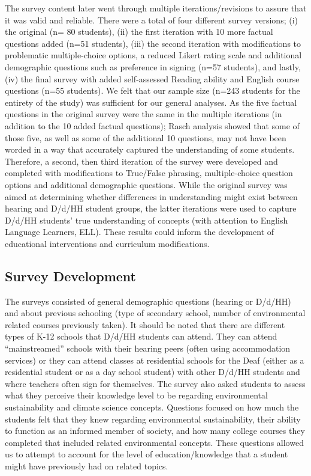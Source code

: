 \documentclass[11.5pt]{sig-alternate} %
\begin{document}
\begin{large}
The survey content later went through multiple iterations/revisions to assure that it was valid and reliable.  There were a total of four different survey versions; (i) the original (n= 80 students), (ii) the first iteration with 10 more factual questions added (n=51 students), (iii) the second iteration with modifications to problematic multiple-choice options, a reduced Likert rating scale and additional demographic questions such as preference in signing (n=57 students), and lastly, (iv) the final survey with added self-assessed Reading ability and English course questions (n=55 students). We felt that our sample size (n=243 students for the entirety of the study) was sufficient for our general analyses. As the five factual questions in the original survey were the same in the multiple iterations (in addition to the 10 added factual questions); Rasch analysis showed that some of those five, as well as some of the additional 10 questions, may not have been worded in a way that accurately captured the understanding of some students.  Therefore, a second, then third iteration of the survey were developed and completed with modifications to True/False phrasing, multiple-choice question options and additional demographic questions. While the original survey was aimed at determining whether differences in understanding might exist between hearing and D/d/HH student groups, the latter iterations were used to capture D/d/HH students’ true understanding of concepts (with attention to English Language Learners, ELL).  These results could inform the development of educational interventions and curriculum modifications. 

\subsection*{Survey Development}

The surveys consisted of general demographic questions (hearing or D/d/HH) and about previous schooling (type of secondary school, number of environmental related courses previously taken).  It should be noted that there are different types of K-12 schools that D/d/HH students can attend. They can attend “mainstreamed” schools with their hearing peers (often using accommodation services) or they can attend classes at residential schools for the Deaf (either as a residential student or as a day school student) with other D/d/HH students and where teachers often sign for themselves.  The survey also asked students to assess what they perceive their knowledge level to be regarding environmental sustainability and climate science concepts. Questions focused on how much the students felt that they knew regarding environmental sustainability, their ability to function as an informed member of society, and how many college courses they completed that included related environmental concepts. These questions allowed us to attempt to account for the level of education/knowledge that a student might have previously had on related topics. 


\end{large}
\end{document}
